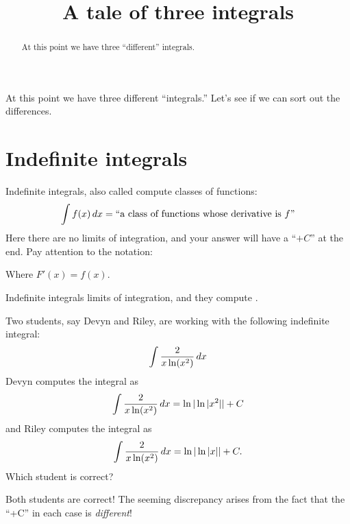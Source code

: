\documentclass{ximera}
\title[Dig-In:]{A tale of three integrals}
\begin{document}
\begin{abstract}
  At this point we have three ``different'' integrals. 
\end{abstract}
\maketitle

At this point we have three different ``integrals.'' Let's see if we
can sort out the differences.

\section{Indefinite integrals}

Indefinite integrals, also called  compute
classes of functions:
\[
\int f(x) \,d x = \text{``a class of functions whose derivative is $f$''}
\]
Here there are no limits of integration, and your answer will have a
``$+C$'' at the end. Pay attention to the notation:
\begin{center}
\end{center}
Where $F'(x) = f(x)$.
\begin{explanation}%
  Indefinite integrals
   limits of
  integration, and they compute .
\end{explanation}

\begin{question}
  Two students, say Devyn and Riley, are working with the following
  indefinite integral:
  \[
  \int \frac{2}{x\ln(x^2)}\,d x
  \]
  Devyn computes the integral as
  \[
  \int \frac{2}{x\ln(x^2)}\,d x = \ln|\ln|x^2|| + C
  \]
  and Riley computes the integral as
  \[
  \int \frac{2}{x\ln(x^2)}\,d x = \ln|\ln|x|| + C.
  \]
  Which student is correct?
  \begin{multipleChoice}
  \end{multipleChoice}
  \begin{feedback}
    Both students are correct! The seeming discrepancy arises from the
    fact that the ``+C'' in each case is \textit{different}!
  \end{feedback}
\end{question}
\end{document}
